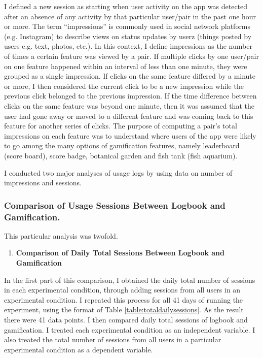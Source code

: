 I defined a new session as starting when user activity on the app was detected after an absence of any activity by that particular user/pair in the past one hour or more. The term ``impressions'' is commonly used in social network platforms (e.g. Instagram) to describe views on status updates by userz (things posted by users e.g. text, photos, etc.). In this context, I define impressions as the number of times a certain feature was viewed by a pair. If multiple clicks by one user/pair on one feature happened within an interval of less than one minute, they were grouped as a single impression. If clicks on the same feature differed by a minute or more, I then considered the current click to be a new impression while the previous click belonged to the previous impression. If the time difference between clicks on the same feature was beyond one minute, then it was assumed that the user had gone away or moved to a different feature and was coming back to this feature for another series of clicks. The purpose of computing a pair's total impressions on each feature was to understand where users of the app were likely to go among the many options of gamification features, namely leaderboard (score board), score badge, botanical garden and fish tank (fish aquarium). 
 
I conducted two major analyses of usage logs by using data on number of impressions and sessions. 
\subsubsection*{Comparison of Usage Sessions Between Logbook and Gamification.}
This particular analysis was twofold.
\begin{enumerate}[label=(\alph*)]
\item \textbf{Comparison of Daily Total Sessions Between Logbook and Gamification}
\end{enumerate}
In the first part of this comparison, I obtained the daily total number of sessions in each experimental condition, through adding sessions from all users in an experimental condition. I repeated this process for all 41 days of running the experiment, using the format of Table \ref{table:totaldailysessions}. As the result there were 41 data points. I then compared daily total sessions of logbook and gamification. I treated each experimental condition as an independent variable. I also treated the total number of sessions from all users in a particular experimental condition as a dependent variable.    

